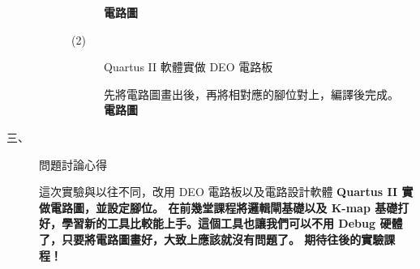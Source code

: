 \documentclass[12pt, a4paper]{article}
\begin{document}
\begin{description}
\begin{description}
\begin{description}
                  \bf {電路圖} \\             
                  \normalfont
              \item [(2)] Quartus II 軟體實做 DEO 電路板 \\[6cm]
              
              \begin{minipage}{\linewidth}
                \normalfont
                先將電路圖畫出後，再將相對應的腳位對上，編譯後完成。\\
                \bf{電路圖} \\[.4cm]
              \end{minipage}
              
            \end{description}
          \normalsize  
        \normalsize
      \end{description}
    \item [三、]問題討論心得 \\[.6cm]
      \begin{minipage}[t]{\linewidth}
        \fontsize{16}{18}\selectfont
          這次實驗與以往不同，改用 DEO 電路板以及電路設計軟體 \bf{Quartus II} \normalfont 實做電路圖，並設定腳位。
          在前幾堂課程將邏輯閘基礎以及 K-map 基礎打好，學習新的工具比較能上手。這個工具也讓我們可以不用 Debug 硬體了，只要將電路圖畫好，大致上應該就沒有問題了。
          期待往後的實驗課程！
        \normalsize  
      \end{minipage}
  \normalsize
\end{description}
\end{document}
